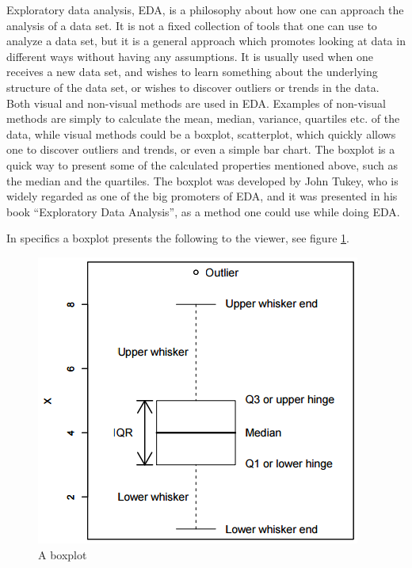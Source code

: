 \documentclass[Report.tex]{subfiles}
\begin{document}
Exploratory data analysis, EDA, is a philosophy about how one can approach the analysis of a data set.
It is not a fixed collection of tools that one can use to analyze a data set, but it is a general
approach which promotes looking at data in different ways without having any assumptions. It is usually
used when one receives a new data set, and wishes to learn something about the underlying structure of the
data set, or wishes to discover outliers or trends in the data. Both visual and non-visual methods are used
in EDA. Examples of non-visual methods are simply to calculate the mean, median, variance, quartiles etc. of
the data, while visual methods could be a boxplot, scatterplot, which quickly allows one to discover outliers and trends, or even a simple
bar chart. The boxplot is a quick way to present some of the calculated properties mentioned above, such as the median and the 
quartiles. The boxplot was developed by John Tukey\cite{Weimer}, who is widely regarded as one of the big promoters of EDA, and
it was presented in his book ``Exploratory Data Analysis'', as a method one could use while doing EDA.

In specifics a boxplot\cite{Seltman} presents the following to the viewer, see figure \ref{fig:boxplot}.

\begin{figure}
\center
\includegraphics[]{"Figures/boxplot"}

\caption{A boxplot\cite{Seltman}}
\label{fig:boxplot}
\end{figure}
\end{document}

